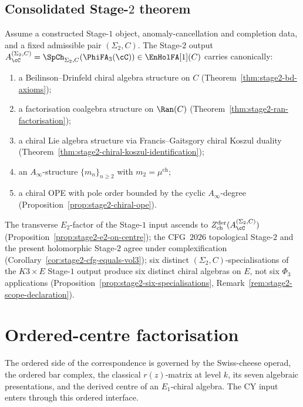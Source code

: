 \subsection{Consolidated Stage-$2$ theorem}
\label{subsec:stage2-consolidated}

\begin{theorem}
\label{thm:stage2-consolidated}
Assume a constructed Stage-$1$ object, anomaly-cancellation and completion data, and a fixed admissible pair $(\Sigma_2,C)$. The Stage-$2$ output $A_\cC^{(\Sigma_2,C)}=\SpCh_{\Sigma_2,C}(\PhiFA_3(\cC))\in\EnHolFA[1](C)$ carries canonically:
\begin{enumerate}[label=\textup{(\roman*)}]
 \item a Beilinson--Drinfeld chiral algebra structure on $C$ \textup{(Theorem~\ref{thm:stage2-bd-axioms})};
 \item a factorisation coalgebra structure on $\Ran(C)$ \textup{(Theorem~\ref{thm:stage2-ran-factorisation})};
 \item a chiral Lie algebra structure via Francis--Gaitsgory chiral Koszul duality \textup{(Theorem~\ref{thm:stage2-chiral-koszul-identification})};
 \item an $A_\infty$-structure $\{m_n\}_{n\geq 2}$ with $m_2=\mu^{\mathrm{ch}}$;
 \item a chiral OPE with pole order bounded by the cyclic $A_\infty$-degree \textup{(Proposition~\ref{prop:stage2-chiral-ope})}.
\end{enumerate}
The transverse $E_2$-factor of the Stage-$1$ input ascends to $Z^{\mathrm{der}}_{\mathrm{ch}}(A_\cC^{(\Sigma_2,C)})$ \textup{(Proposition~\ref{prop:stage2-e2-on-centre})}; the CFG~$2026$ topological Stage-$2$ and the present holomorphic Stage-$2$ agree under complexification \textup{(Corollary~\ref{cor:stage2-cfg-equals-vol3})}; six distinct $(\Sigma_2,C)$-specialisations of the $K3\times E$ Stage-$1$ output produce six distinct chiral algebras on $E$, not six $\Phi_3$ applications \textup{(Proposition~\ref{prop:stage2-six-specialisations}, Remark~\ref{rem:stage2-scope-declaration})}.
\end{theorem}

\section{Ordered-centre factorisation}
\label{sec:vol2-connection}

The ordered side of the correspondence is governed by the Swiss-cheese operad, the ordered bar complex, the classical $r(z)$-matrix at level $k$, its seven algebraic presentations, and the derived centre of an $E_1$-chiral algebra. The CY input enters through this ordered interface.

